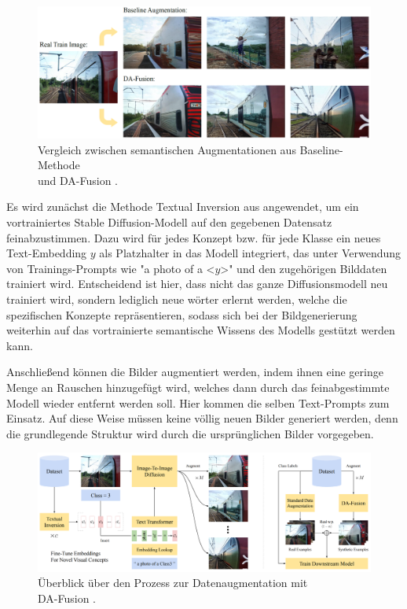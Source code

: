 \begin{figure}[h]
	\centering
	\includegraphics[width=\textwidth]{figure_da-fusion_vs_baseline.png}
	\caption{Vergleich zwischen semantischen Augmentationen aus Baseline-Methode\\
	und DA-Fusion \parencite{Trabucco2023dafusion}.}
	\label{fig:da-fusion}
\end{figure}

Es wird zunächst die Methode Textual Inversion aus \parencite{Gal2022textualinversion} angewendet, um ein vortrainiertes Stable Diffusion-Modell auf den gegebenen Datensatz feinabzustimmen. Dazu wird für jedes Konzept bzw. für jede Klasse ein neues Text-Embedding $y$ als Platzhalter in das Modell integriert, das unter Verwendung von Trainings-Prompts wie "a photo of a <$y$>" und den zugehörigen Bilddaten trainiert wird. Entscheidend ist hier, dass nicht das ganze Diffusionsmodell neu trainiert wird, sondern lediglich neue wörter erlernt werden, welche die spezifischen Konzepte repräsentieren, sodass sich bei der Bildgenerierung weiterhin auf das vortrainierte semantische Wissens des Modells gestützt werden kann.

Anschließend können die Bilder augmentiert werden, indem ihnen eine geringe Menge an Rauschen hinzugefügt wird, welches dann durch das feinabgestimmte Modell wieder entfernt werden soll. Hier kommen die selben Text-Prompts zum Einsatz. Auf diese Weise müssen keine völlig neuen Bilder generiert werden, denn die grundlegende Struktur wird durch die ursprünglichen Bilder vorgegeben.

\begin{figure}
	\centering
	\includegraphics[width=\textwidth]{figure_da-fusion_architecture.png}
	\caption{Überblick über den Prozess zur Datenaugmentation mit\\
	DA-Fusion \parencite{Trabucco2023dafusion}.}
	\label{fig:da-fusion-process}
\end{figure}

